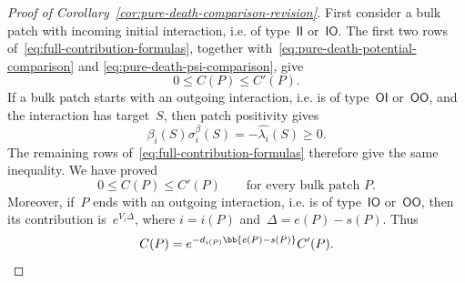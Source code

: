 \begin{proof}[Proof of Corollary~\ref{cor:pure-death-comparison-revision}]
First consider a bulk patch with incoming initial interaction, i.e. of type~$\mathsf{II}$ or~$\mathsf{IO}$. The first two
rows of~\eqref{eq:full-contribution-formulas},
together with~\eqref{eq:pure-death-potential-comparison} and
\eqref{eq:pure-death-psi-comparison}, give
\begin{equation*}
0\leq C(P)\leq C'(P).
\end{equation*}
If a bulk patch starts with an outgoing interaction, i.e. is of type~$\mathsf{OI}$ or~$\mathsf{OO}$, and the interaction has target~$S$, then patch positivity gives
\begin{equation*}
\beta_i(S)\sigma_i^\beta(S)
=
-\widehat{\lambda_i}(S)
\geq0.
\end{equation*}
The remaining rows of~\eqref{eq:full-contribution-formulas} therefore give the
same inequality. We have proved
\begin{equation}
\label{eq:pure-death-bulk-patch-comparison}
0\leq C(P)\leq C'(P)
\qquad
\text{for every bulk patch }P.
\end{equation}
Moreover, if~$P$ ends with an outgoing interaction, i.e. is of type~$\mathsf{IO}$ or~$\mathsf{OO}$, then its contribution is~$e^{V_i\Delta}$, where
$i=i(P)$ and~$\Delta=e(P)-s(P)$. Thus
\begin{equation}
\label{eq:pure-death-outgoing-terminal-factor}
C(P)
=
e^{-d_{i(P)}\bb{e(P)-s(P)}}C'(P).
\end{equation}


\end{proof}
